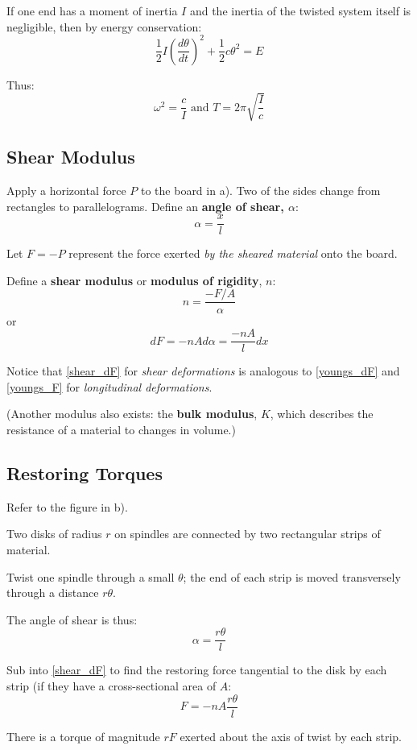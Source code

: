 \documentclass[11pt,letterpaper,titlepage,oneside]{book}
\begin{document}
If one end has a moment of inertia $I$ and the inertia of the twisted system itself is negligible, then by energy conservation:
\[ \frac{1}{2}I\left( \frac{d\theta}{dt}\right)^2 + \frac{1}{2} c\theta^2 = E \]

Thus:
\begin{equation}
\omega^2 = \frac{c}{I} \text{ and } T = 2\pi\sqrt{\frac{I}{c}} \label{torsionalT}
\end{equation}

\subsection{Shear Modulus}
Apply a horizontal force $P$ to the board in a). Two of the sides change from rectangles to parallelograms. Define an \textbf{angle of shear, $\alpha$}:
\[ \alpha = \frac{x}{l} \]

Let $F=-P$ represent the force exerted \textit{by the sheared material} onto the board.

Define a \textbf{shear modulus} or \textbf{modulus of rigidity}, $n$:
\[ n = \frac{-F/A}{\alpha} \]
or
\begin{equation} \boxed{dF = -nA d\alpha = \frac{-nA}{l}dx} \label{shear_dF} \end{equation}

Notice that \eqref{shear_dF} for \textit{shear deformations} is analogous to \eqref{youngs_dF} and \eqref{youngs_F} for \textit{longitudinal deformations}.

(Another modulus also exists: the \textbf{bulk modulus}, $K$, which describes the resistance of a material to changes in volume.)

\subsection{Restoring Torques}
Refer to the figure in b).

Two disks of radius $r$ on spindles are connected by two rectangular strips of material.

Twist one spindle through a small $\theta$; the end of each strip is moved transversely through a distance $r\theta$.

The angle of shear is thus: \[ \alpha = \frac{r\theta}{l} \]

Sub into \eqref{shear_dF} to find the restoring force tangential to the disk by each strip (if they have a cross-sectional area of $A$:
\[ F = -nA\frac{r\theta}{l} \]

There is a torque of magnitude $rF$ exerted about the axis of twist by each strip.
\end{document}
